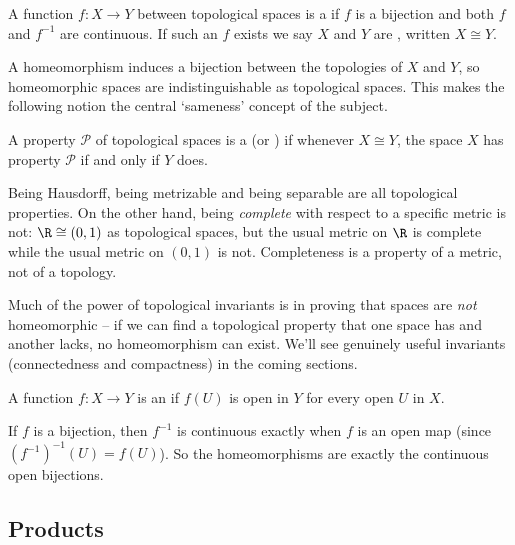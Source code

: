 \begin{definition}[Homeomorphism]
    A function $f: X \rightarrow Y$ between topological spaces is a  if $f$ is a bijection and both $f$ and $f^{-1}$ are continuous. If such an $f$ exists we say $X$ and $Y$ are , written $X \cong Y$.
\end{definition}

A homeomorphism induces a bijection between the topologies of $X$ and $Y$, so homeomorphic spaces are indistinguishable as topological spaces. This makes the following notion the central `sameness' concept of the subject.

\begin{definition}
    A property $\mathcal{P}$ of topological spaces is a  (or ) if whenever $X \cong Y$, the space $X$ has property $\mathcal{P}$ if and only if $Y$ does.
\end{definition}

\begin{example}
    Being Hausdorff, being metrizable and being separable are all topological properties. On the other hand, being \emph{complete} with respect to a specific metric is not: $\R \cong (0, 1)$ as topological spaces, but the usual metric on $\R$ is complete while the usual metric on $(0, 1)$ is not. Completeness is a property of a metric, not of a topology.
\end{example}

Much of the power of topological invariants is in proving that spaces are \emph{not} homeomorphic -- if we can find a topological property that one space has and another lacks, no homeomorphism can exist. We'll see genuinely useful invariants (connectedness and compactness) in the coming sections.

\begin{definition}
    A function $f: X \rightarrow Y$ is an  if $f(U)$ is open in $Y$ for every open $U$ in $X$.
\end{definition}

If $f$ is a bijection, then $f^{-1}$ is continuous exactly when $f$ is an open map (since $(f^{-1})^{-1}(U) = f(U)$). So the homeomorphisms are exactly the continuous open bijections.

\subsection{Products}

